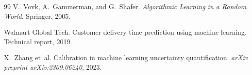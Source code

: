 \documentclass[10pt,twocolumn]{article}
\begin{document}
\begin{thebibliography}{99}
V.~Vovk, A.~Gammerman, and G.~Shafer.
\newblock \emph{Algorithmic Learning in a Random World}.
\newblock Springer, 2005.

Walmart Global Tech.
\newblock Customer delivery time prediction using machine learning.
\newblock Technical report, 2019.

X.~Zhang et~al.
\newblock Calibration in machine learning uncertainty quantification.
\newblock \emph{arXiv preprint arXiv:2309.06240}, 2023.

\end{thebibliography}
\end{document}
